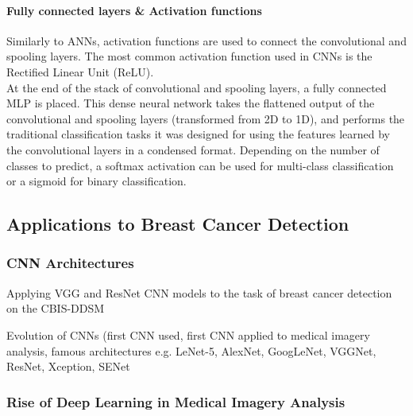 \paragraph{Fully connected layers \& Activation functions}

Similarly to ANNs, activation functions are used to connect the convolutional and spooling layers. The most common activation function used in CNNs is the Rectified Linear Unit (ReLU).\\

At the end of the stack of convolutional and spooling layers, a fully connected MLP is placed. This dense neural network takes the flattened output of the convolutional and spooling layers (transformed from 2D to 1D), and performs the traditional classification tasks it was designed for using the features learned by the convolutional layers in a condensed  format. Depending on the number of classes to predict, a softmax activation can be used for multi-class classification or a sigmoid for binary classification.

\subsection{Applications to Breast Cancer Detection}

\subsubsection{CNN Architectures}

Applying VGG and ResNet CNN models to the task of breast cancer detection on the CBIS-DDSM

Evolution of CNNs (first CNN used, first CNN applied to medical imagery analysis, famous architectures e.g. LeNet-5, AlexNet, GoogLeNet, VGGNet, ResNet, Xception, SENet



\subsubsection{Rise of Deep Learning in Medical Imagery Analysis}

